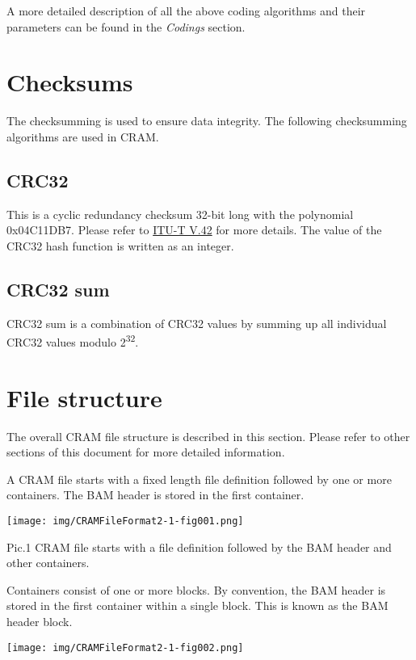 \documentclass[a4paper]{article}
\begin{document}
A more detailed description of all the above coding algorithms and their parameters 
can be found in the \emph{Codings }section. 

\section{\textbf{Checksums}}
The checksumming is used to ensure data integrity. The following checksumming algorithms are used in CRAM.
\subsection{\textbf{CRC32}}
This is a cyclic redundancy checksum 32-bit long with the polynomial 0x04C11DB7. Please refer to \href{http://www.itu.int/rec/recommendation.asp?type=folders&lang=e&parent=T-REC-V.42}{ITU-T V.42} for more details. The value of the CRC32 hash function is written as an integer.
\subsection{\textbf{CRC32 sum}}
CRC32 sum is a combination of CRC32 values by summing up all individual CRC32 values modulo 2\textsuperscript{32}. 

\section{\textbf{File structure}}

The overall CRAM file structure is described in this section. Please refer to other 
sections of this document for more detailed information. 

A CRAM file starts with a fixed length file definition followed by one or more 
containers. The BAM header is stored in the first container.

\texttt{[image: img/CRAMFileFormat2-1-fig001.png]}

Pic.1 CRAM file starts with a file definition followed by the BAM header and other 
containers.

Containers consist of one or more blocks. By convention, the BAM header is stored 
in the first container within a single block. This is known as the BAM header block.

\texttt{[image: img/CRAMFileFormat2-1-fig002.png]}
\end{document}
